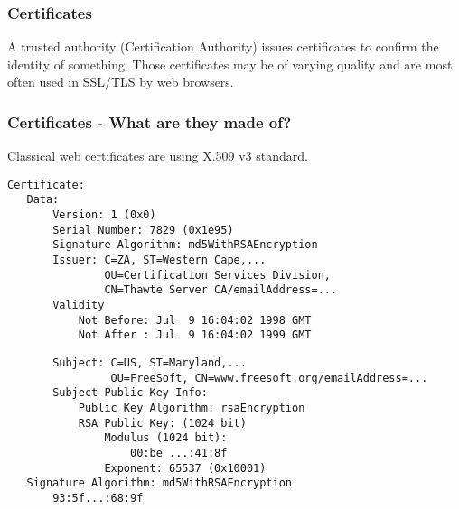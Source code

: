\begin{frame}
\frametitle{Certificates}
A trusted authority (Certification Authority) issues certificates to
confirm the identity of something. Those certificates may be of varying
quality and are most often used in SSL/TLS by web browsers.
\end{frame}

\begin{frame}[fragile]
\frametitle{Certificates - What are they made of?}
Classical web certificates are using X.509 v3 standard.
\begin{lstlisting}
Certificate:
   Data:
       Version: 1 (0x0)
       Serial Number: 7829 (0x1e95)
       Signature Algorithm: md5WithRSAEncryption
       Issuer: C=ZA, ST=Western Cape,...
               OU=Certification Services Division,
               CN=Thawte Server CA/emailAddress=...
       Validity
           Not Before: Jul  9 16:04:02 1998 GMT
           Not After : Jul  9 16:04:02 1999 GMT
\end{lstlisting}
\end{frame}
\begin{frame}[fragile]
\begin{lstlisting}
       Subject: C=US, ST=Maryland,...
                OU=FreeSoft, CN=www.freesoft.org/emailAddress=...
       Subject Public Key Info:
           Public Key Algorithm: rsaEncryption
           RSA Public Key: (1024 bit)
               Modulus (1024 bit):
                   00:be ...:41:8f
               Exponent: 65537 (0x10001)
   Signature Algorithm: md5WithRSAEncryption
       93:5f...:68:9f
\end{lstlisting}
\end{frame}

